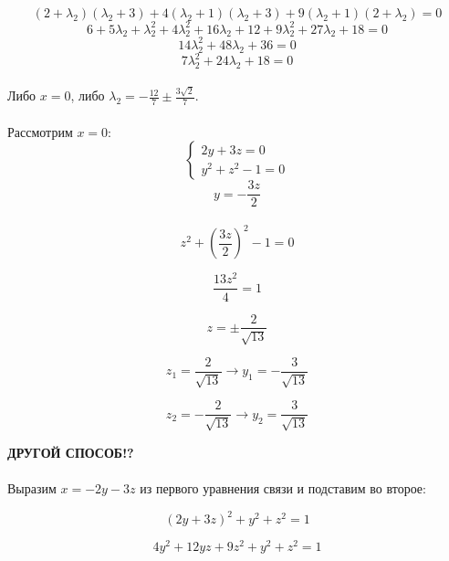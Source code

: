 \documentclass[a5paper, 10pt]{article}
\theoremstyle{definition}
\theoremstyle{plain}
\theoremstyle{remark}
\begin{document}
\begin{equation}
 (2+\lambda_2)(\lambda_2 + 3) + 4(\lambda_2 + 1)(\lambda_2 + 3)+9(\lambda_2 + 1) (2+\lambda_2) = 0
\end{equation}
\begin{equation}
 6 + 5\lambda_2 + \lambda_2^2  + 4\lambda_2^2 + 16\lambda_2 + 12+9\lambda_2^2 +27\lambda_2 + 18 = 0
\end{equation}
\begin{equation}
14 \lambda_2^2 + 48  \lambda_2 +36  = 0
\end{equation}
\begin{equation}
7 \lambda_2^2 + 24  \lambda_2 +18  = 0
\end{equation}
 \\
Либо $x=0$, либо $\lambda_2= -\frac{12}{7} \pm \frac{3 \sqrt{2}}{7}$.
\\
\\
Рассмотрим $x = 0$:
\begin{equation}
\begin{cases}
 2y+3z = 0\\
y^2+z^2 - 1 = 0
\end{cases}
\end{equation}
\begin{equation}
y=-\frac{3z}{2}
\end{equation}
\\
\begin{equation}
z^2+\left( \frac{3z}{2} \right)^2 - 1 = 0
\end{equation}

\begin{equation}
\frac{13z^2}{4} = 1
\end{equation}

\begin{equation}
z = \pm \frac{2}{\sqrt{13}}
\end{equation}

\begin{equation}
z_1 = \frac{2}{\sqrt{13}} \to y_1 = -\frac{3}{\sqrt{13}}
\end{equation}

\begin{equation}
z_2 = -\frac{2}{\sqrt{13}} \to y_2 = \frac{3}{\sqrt{13}}
\end{equation}

\textbf{ДРУГОЙ СПОСОБ!?}\\
\\
Выразим $x = -2y-3z$ из первого уравнения связи и подставим во второе:

\begin{equation}
  (2y+3z)^2 +y^2+z^2=1
\end{equation}

\begin{equation}
  4y^2+12yz+9z^2 +y^2+z^2=1
\end{equation}
\end{document}

